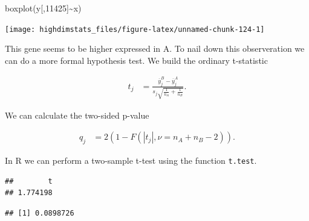 \documentclass[
]{book}
\newenvironment{Shaded}{\begin{snugshade}}{\end{snugshade}}
\newcommand{\AttributeTok}[1]{\textcolor[rgb]{0.77,0.63,0.00}{#1}}
\newcommand{\CommentTok}[1]{\textcolor[rgb]{0.56,0.35,0.01}{\textit{#1}}}
\newcommand{\ConstantTok}[1]{\textcolor[rgb]{0.00,0.00,0.00}{#1}}
\newcommand{\DecValTok}[1]{\textcolor[rgb]{0.00,0.00,0.81}{#1}}
\newcommand{\FunctionTok}[1]{\textcolor[rgb]{0.00,0.00,0.00}{#1}}
\newcommand{\NormalTok}[1]{#1}
\newcommand{\OtherTok}[1]{\textcolor[rgb]{0.56,0.35,0.01}{#1}}
\newcommand{\SpecialCharTok}[1]{\textcolor[rgb]{0.00,0.00,0.00}{#1}}
\begin{document}
\begin{Shaded}
\begin{Highlighting}[]
\FunctionTok{boxplot}\NormalTok{(y[,}\DecValTok{11425}\NormalTok{]}\SpecialCharTok{\textasciitilde{}}\NormalTok{x)}
\end{Highlighting}
\end{Shaded}

\begin{center}\texttt{[image: highdimstats\_files/figure-latex/unnamed-chunk-124-1]} \end{center}

This gene seems to be higher expressed in A. To nail down this observeration we can do a more formal hypothesis test. We build the ordinary t-statistic

\begin{align*}
t_{j}&=\frac{\overline{y}_{j}^B-\overline{y}_{j}^A}{s_{j}\sqrt{\frac{1}{n_A}+\frac{1}{n_B}}}.
\end{align*}

We can calculate the two-sided p-value

\begin{align*}
q_j&=2\left(1-F(|t_j|,\nu=n_A+n_B-2)\right).
\end{align*}

In R we can perform a two-sample t-test using the function \texttt{t.test}.

\begin{Shaded}
\end{Shaded}

\begin{verbatim}
##        t 
## 1.774198
\end{verbatim}

\begin{Shaded}
\end{Shaded}

\begin{verbatim}
## [1] 0.0898726
\end{verbatim}
\end{document}
